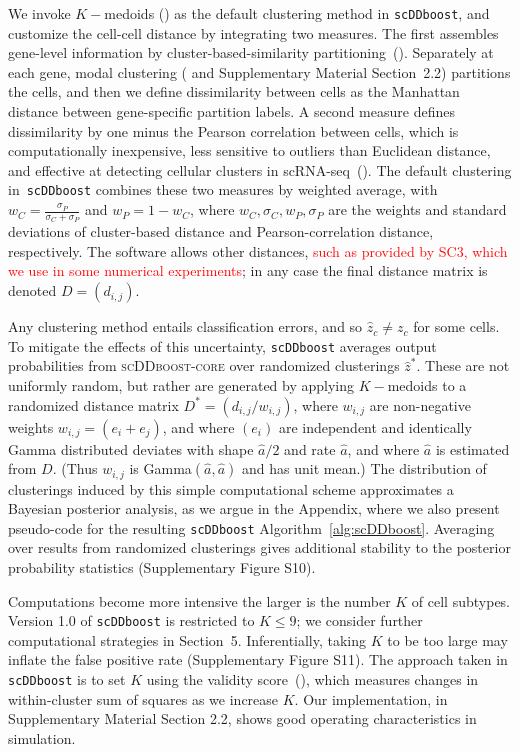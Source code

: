 \documentclass[aoas,preprint]{imsart}
\begin{document}
We invoke $K-$medoids (\cite{kmedoids}) 
as the default clustering method in \texttt{scDDboost}, and customize the cell-cell distance by integrating two measures.  
The first assembles gene-level information by cluster-based-similarity partitioning~(\cite{ref:cspa}).
 Separately at each gene,   modal clustering (\cite{ref:dahl} and Supplementary Material Section~2.2) partitions the cells, and
then we define dissimilarity between cells as the Manhattan distance between gene-specific 
partition labels.
A second measure defines dissimilarity by one minus the 
Pearson correlation between cells, which is computationally inexpensive,
less sensitive to outliers than Euclidean distance, and effective at detecting cellular clusters in 
scRNA-seq~(\cite{Cor}).
The default clustering in~\verb+scDDboost+ combines these 
two measures by weighted average, 
with  $w_C = \frac{\sigma_P}{\sigma_C + \sigma_P}$ and $w_P = 1 - w_C$, where $w_C,\sigma_C, w_P, \sigma_P$ are the weights and standard deviations of cluster-based distance and Pearson-correlation distance, respectively.  The software allows 
other distances, \textcolor{red}{such as provided by SC3, which we use in some numerical experiments}; in any case 
the final distance matrix is denoted $D=\left( d_{i,j} \right)$. 

Any clustering method  entails classification errors, and so $\hat z_c \neq z_c$ for some cells. To mitigate
the effects of this uncertainty, \texttt{scDDboost} averages output probabilities from \textsc{scDDboost-core} over
randomized clusterings $\hat z^*$.  These are not uniformly random, but rather are generated by applying $K-$medoids
to a randomized distance matrix $D^*=\left( d_{i,j}/ w_{i,j}\right)$, 
where $w_{i,j}$ are   non-negative weights
$w_{i,j} = ( e_i + e_j )$, and where $( e_i) $ are independent and identically 
Gamma distributed deviates with shape $\hat a/2$  and rate $\hat a$, 
and where $\hat a$ is estimated from $D$. (Thus $w_{i,j}$ is Gamma$(\hat a, \hat a)$ and has unit mean.)  
The distribution of
clusterings induced by this simple computational 
scheme approximates a Bayesian posterior analysis, as we argue in
the Appendix, where we also present pseudo-code for the resulting \texttt{scDDboost} 
Algorithm~\ref{alg:scDDboost}.
Averaging over results from randomized clusterings 
 gives additional stability to the posterior probability statistics
 (Supplementary Figure S10).


Computations become more intensive the larger is the number $K$ of cell subtypes. Version 1.0 of 
\verb+scDDboost+ is restricted to $K\leq 9$; we consider further computational
strategies in Section~5. Inferentially, 
 taking $K$ to be too large may inflate the false positive rate (Supplementary Figure S11).
 The approach
taken in \verb+scDDboost+ is to set $K$ using the validity score~(\cite{selK}), which measures 
changes in within-cluster sum of squares as we increase $K$.  Our implementation,  in
Supplementary Material Section 2.2, shows good operating characteristics in simulation.
\end{document}
